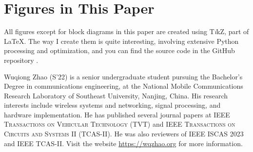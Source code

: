 \documentclass[journal,twoside]{IEEEtran}
\begin{document}
  \section{Figures in This Paper}

    All figures except for block diagrams in this paper
    are created using T\textit{i}kZ, part of \LaTeX{}.
    The way I create them is quite interesting, involving extensive Python processing and optimization,
    and you can find the source code in the GitHub repository \cite{github_repo}.

  
  

  \begin{IEEEbiographynophoto}%
    {Wuqiong Zhao} (S'22)
    is a senior undergraduate student pursuing the Bachelor's Degree in communications engineering,
    at the National Mobile Communications Research Laboratory of Southeast University, Nanjing, China.
    His research interests include wireless systems and networking, signal processing, and hardware implementation.
    He has published several journal papers at \textsc{IEEE Transactions on Vehicular Technology} (TVT)
    and \textsc{IEEE Transactions on Circuits and Systems II} (TCAS-II).
    He was also reviewers of IEEE ISCAS 2023 and IEEE TCAS-II.
    Visit the website \url{https://wqzhao.org} for more information.
  \end{IEEEbiographynophoto}
\end{document}
